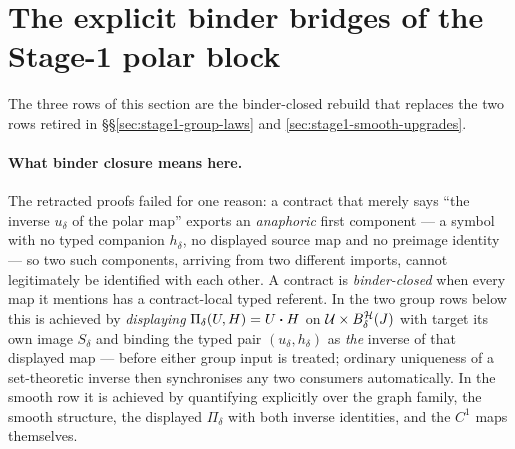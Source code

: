 \section{The explicit binder bridges of the Stage-1 polar block}\label{sec:stage1-explicit-bridges}

The three rows of this section are the binder-closed rebuild that replaces the two rows
retired in \S\S\ref{sec:stage1-group-laws} and \ref{sec:stage1-smooth-upgrades}.

\paragraph{What binder closure means here.} The retracted proofs failed for one reason: a
contract that merely says ``the inverse $u_\delta$ of the polar map'' exports an
\emph{anaphoric} first component --- a symbol with no typed companion $h_\delta$, no
displayed source map and no preimage identity --- so two such components, arriving from two
different imports, cannot legitimately be identified with each other. A contract is
\emph{binder-closed} when every map it mentions has a contract-local typed referent. In the
two group rows below this is achieved by \emph{displaying} $\Pi_\delta(U,H)=U\mathbin{\bm{\cdot}} H$ on
$\mathcal U\times B^{\mathcal H}_{\delta}(J)$ with target its own image $S_\delta$ and binding the
typed pair $(u_\delta,h_\delta)$ as \emph{the} inverse of that displayed map --- before
either group input is treated; ordinary uniqueness of a set-theoretic inverse then
synchronises any two consumers automatically. In the smooth row it is achieved by
quantifying explicitly over the graph family, the smooth structure, the displayed
$\Pi_\delta$ with both inverse identities, and the $C^{1}$ maps themselves.

